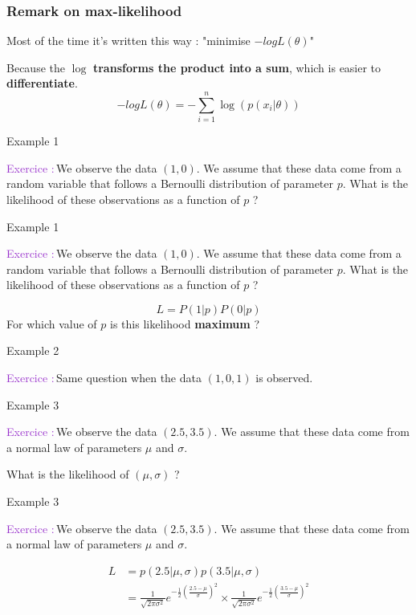 \documentclass[usenames,dvipsnames,french]{beamer}
\newcounter{numexos}%
\newcommand{\exercice}[1]{%
\addtocounter{numexos}{1}%
\textcolor{DarkOrchid}{Exercice\,\thenumexos\,:}\,#1%
}
\begin{document}
\begin{frame}
\frametitle{Remark on max-likelihood}
Most of the time it's written this way : "minimise $-log L(\theta)$"

Because the $\log$ \textbf{transforms the product into a sum}, which is easier to \textbf{differentiate}.
\begin{equation}
	-log L(\theta)=-\sum_{i=1}^{n}\log(p(x_i|\theta))
\end{equation}
\end{frame}

\begin{frame}{Example 1}
    \exercice{We observe the data $(1,0)$. We assume that these data come from a random variable that follows a Bernoulli distribution of parameter $p$. What is the likelihood of these observations as a function of $p$ ?}
\addtocounter{numexos}{-1}
\end{frame}

\begin{frame}{Example 1}
    \exercice{We observe the data $(1,0)$. We assume that these data come from a random variable that follows a Bernoulli distribution of parameter $p$. What is the likelihood of these observations as a function of $p$ ?}
    \begin{equation}
	L=P(1|p)P(0|p)
    \end{equation}
    For which value of $p$ is this likelihood \textbf{{maximum}}  ?
\end{frame}

\begin{frame}{Example 2}
    \exercice{Same question when the data $(1, 0, 1)$ is observed.}
\end{frame}

\begin{frame}{Example 3}
    \exercice{We observe the data $(2.5, 3.5)$. We assume that these data come from a normal law of parameters $\mu$ and $\sigma$.}
\addtocounter{numexos}{-1}

    What is the likelihood of $(\mu, \sigma)$ ?
\end{frame}

\begin{frame}{Example 3}
    \exercice{We observe the data $(2.5, 3.5)$. We assume that these data come from a normal law of parameters $\mu$ and $\sigma$.}
\addtocounter{numexos}{-1}
    \begin{equation}
	\begin{aligned}
	    \label{eq:}
	    L &= p(2.5|\mu, \sigma)p(3.5|\mu,\sigma)\\
	    &= \frac{1}{ \sqrt{2\pi \sigma^2} } e^{ - \frac{1}{2} ( \frac{2.5-\mu}{\sigma}   )^2 }\times \frac{1}{ \sqrt{2\pi \sigma^2}  }e^{ - \frac{1}{2} ( \frac{3.5-\mu}{\sigma}   )^2 }
	\end{aligned}
    \end{equation}
\end{frame}
\end{document}
